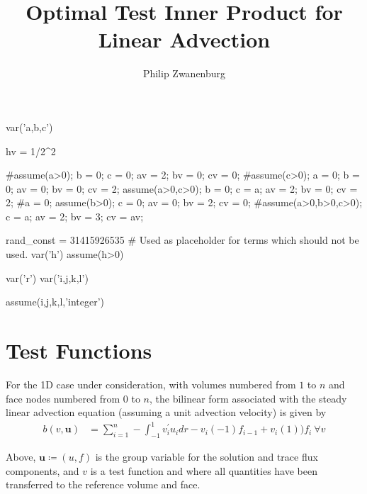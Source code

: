 \documentclass{article}
\title{Optimal Test Inner Product for Linear Advection}
\author{Philip Zwanenburg}
\numberwithin{equation}{section}
\newcommand{\varg}[1]{\mathit{\bm{{#1}}}} %
\newcommand{\jump}[1]{{\llbracket #1\rrbracket}}
\begin{document}
\maketitle


\begin{sagesilent}
var('a,b,c')

hv = 1/2^2

#assume(a>0); b = 0; c = 0; av = 2; bv = 0; cv = 0;
#assume(c>0); a = 0; b = 0; av = 0; bv = 0; cv = 2;
assume(a>0,c>0); b = 0; c = a; av = 2; bv = 0; cv = 2;
#a = 0; assume(b>0); c = 0; av = 0; bv = 2; cv = 0;
#assume(a>0,b>0,c>0); c = a; av = 2; bv = 3; cv = av;
\end{sagesilent}


\begin{sagesilent}
rand_const = 31415926535 # Used as placeholder for terms which should not be used.
var('h')
assume(h>0)

var('r')
var('i,j,k,l')

assume(i,j,k,l,'integer')
\end{sagesilent}

\section{Test Functions}

For the 1D case under consideration, with volumes numbered from $1$ to $n$ and face nodes numbered from $0$ to $n$, the
bilinear form associated with the steady linear advection equation (assuming a unit advection velocity) is given by
\begin{align} \label{eq:bilinear_adv}
b(v,\varg{u}) 
& = \sum_{i=1}^n -\int_{-1}^{1} v_i^{'} u_i dr - v_i(-1)f_{i-1}+v_{i}(1))f_i\ \forall v
\end{align}

Above, $\varg{u} \coloneqq (u,f)$ is the group variable for the solution and trace flux components, and $v$ is a test
function and where all quantities have been transferred to the reference volume and face.
\\~
\end{document}
